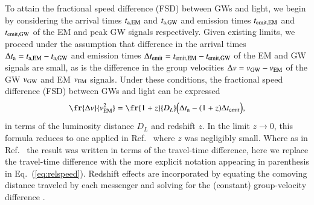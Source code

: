 \documentclass[aps,twocolumn,nofootinbib,nopreprintnumbers,showpacs,linenumbers,floatfix,longbibliography,superscriptaddress,prd]{revtex4-1}
\begin{document}
To attain the fractional speed difference (FSD)
between GWs and light,
we begin by considering the arrival times $t_{\rm a,EM}$ and $t_{\rm a,GW}$
and emission times $t_{\rm emit,EM}$ and $t_{\rm emit,GW}$ 
of the EM and peak GW signals respectively.
Given existing limits,
we proceed under the assumption
that difference in the arrival times 
$\Delta t_{\rm a} = t_{\rm a,EM} - t_{\rm a,GW}$
and
emission times $\Delta t_{\rm emit} = t_{\rm emit,EM} - t_{\rm emit,GW}$
of the EM and GW signals are small,
as is the difference in the group velocities $\Delta v = v_{\rm GW} - v_{\rm EM}$
of the GW $v_{\rm GW}$ and EM $v_{\rm EM}$ signals.
Under these conditions,
the fractional speed difference (FSD) between GWs and light can be expressed
\begin{equation}
\label{eq:relspeed}
\fr{\Delta v}{v_{\rm EM}^2} = \fr{1+z}{D_L} \Big (\Delta t_{\rm a} - (1+z) \Delta t_{\rm emit} \Big),
\end{equation}
in terms of the luminosity distance $D_L$ and redshift $z$.
In the limit $z \rightarrow 0$,
this formula reduces to one applied in Ref.\ \citet{abbott:2017bnsgrb}
where $z$ was negligibly small.
Where as in Ref.\ \citet{abbott:2017bnsgrb} the result was written in terms of the travel-time difference,
here we replace the travel-time difference with the more explicit 
notation appearing in parenthesis in Eq.\ (\ref{eq:relspeed}).
Redshift effects are incorporated by equating the comoving distance
traveled by each messenger
and solving for the (constant) group-velocity difference \cite{will1998bounding,jacob:2008,mirshekari:2012,nishizawa2014measuring,kostelecky:16}.
\end{document}

